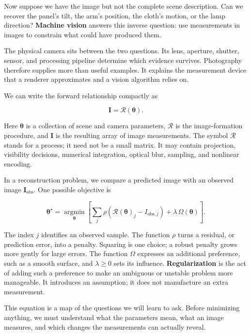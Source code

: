 Now suppose we have the image but not the complete scene description. Can we recover the panel's tilt, the arm's position, the cloth's motion, or the lamp direction? \textbf{Machine vision} answers this inverse question: use measurements in images to constrain what could have produced them.

The physical camera sits between the two questions. Its lens, aperture, shutter, sensor, and processing pipeline determine which evidence survives. Photography therefore supplies more than useful examples. It explains the measurement device that a renderer approximates and a vision algorithm relies on.

We can write the forward relationship compactly as

\[
\mathbf I=\mathcal R(\boldsymbol\theta).
\]

Here \(\boldsymbol\theta\) is a collection of scene and camera parameters, \(\mathcal R\) is the image-formation procedure, and \(\mathbf I\) is the resulting array of image measurements. The symbol \(\mathcal R\) stands for a process; it need not be a small matrix. It may contain projection, visibility decisions, numerical integration, optical blur, sampling, and nonlinear encoding.

In a reconstruction problem, we compare a predicted image with an observed image \(\mathbf I_{\mathrm{obs}}\). One possible objective is

\[
\boldsymbol\theta^{\star}
=\underset{\boldsymbol\theta}{\operatorname{argmin}}
\left[
\sum_j \rho\!\left(\mathcal R(\boldsymbol\theta)_j-I_{\mathrm{obs},j}\right)
+\lambda\,\Omega(\boldsymbol\theta)
\right].
\]

The index \(j\) identifies an observed sample. The function \(\rho\) turns a residual, or prediction error, into a penalty. Squaring is one choice; a robust penalty grows more gently for large errors. The function \(\Omega\) expresses an additional preference, such as a smooth surface, and \(\lambda\geq0\) sets its influence. \textbf{Regularization} is the act of adding such a preference to make an ambiguous or unstable problem more manageable. It introduces an assumption; it does not manufacture an extra measurement.

This equation is a map of the questions we will learn to ask. Before minimizing anything, we must understand what the parameters mean, what an image measures, and which changes the measurements can actually reveal.


